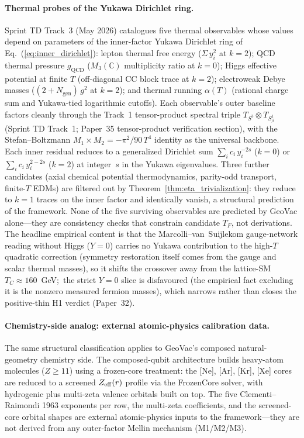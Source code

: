 \documentclass[aps,pra,twocolumn,superscriptaddress,longbibliography]{revtex4-2}
\begin{document}
\paragraph{Thermal probes of the Yukawa Dirichlet ring.}
Sprint TD Track~3 (May 2026) catalogues five thermal
observables whose values depend on parameters of the inner-factor
Yukawa Dirichlet ring of Eq.~(\ref{eq:inner_dirichlet}): lepton
thermal free energy ($\Sigma\,y_i^2$ at $k=2$); QCD thermal pressure
$g_{\mathrm{QCD}}$ ($M_3(\mathbb{C})$ multiplicity ratio at $k=0$);
Higgs effective potential at finite $T$ (off-diagonal CC block
trace at $k=2$); electroweak Debye masses ($(2 + N_{\mathrm{gen}})\,g^2$
at $k=2$); and thermal running $\alpha(T)$ (rational charge sum and
Yukawa-tied logarithmic cutoffs).  Each observable's outer baseline
factors cleanly through the Track~1 tensor-product spectral triple
$T_{S^3}\otimes T_{S^1_\beta}$ (Sprint TD Track~1; Paper~35
tensor-product verification section), with the Stefan--Boltzmann
$M_1\times M_2 = -\pi^2/90\,T^4$ identity as the universal backbone.
Each inner residual reduces to a generalized Dirichlet sum
$\sum_i c_i\, y_i^{-2s}$ ($k=0$) or $\sum_i c_i\, y_i^{2-2s}$ ($k=2$)
at integer~$s$ in the Yukawa eigenvalues.  Three further candidates
(axial chemical potential thermodynamics, parity-odd transport,
finite-$T$ EDMs) are filtered out by Theorem~\ref{thm:eta_trivialization}:
they reduce to $k=1$ traces on the inner factor and identically
vanish, a structural prediction of the framework.  None of the five
surviving observables are predicted by GeoVac alone---they are
consistency checks that constrain candidate $T_F$, not derivations.
The headline empirical content is that the Marcolli--van~Suijlekom
gauge-network reading without Higgs ($Y = 0$) carries no Yukawa
contribution to the high-$T$ quadratic correction (symmetry restoration
itself comes from the gauge and scalar thermal masses), so it shifts the
crossover away from the lattice-SM $T_C \approx 160$~GeV;\ the strict
$Y = 0$ slice is disfavoured (the empirical fact excluding it is the
nonzero measured fermion masses), which narrows rather than closes the
positive-thin H1 verdict (Paper~32).

\paragraph{Chemistry-side analog: external atomic-physics calibration
data.}
The same structural classification applies to GeoVac's composed
natural-geometry chemistry side.  The composed-qubit architecture
builds heavy-atom molecules ($Z \ge 11$) using a frozen-core
treatment: the [Ne], [Ar], [Kr], [Xe] cores are reduced to a screened
$Z_{\rm eff}(r)$ profile via the FrozenCore solver, with hydrogenic
plus multi-zeta valence orbitals built on top.  The five
Clementi--Raimondi 1963 exponents per row, the multi-zeta
coefficients, and the screened-core orbital shapes are external
atomic-physics inputs to the framework---they are not derived from
any outer-factor Mellin mechanism (M1/M2/M3).
\end{document}

